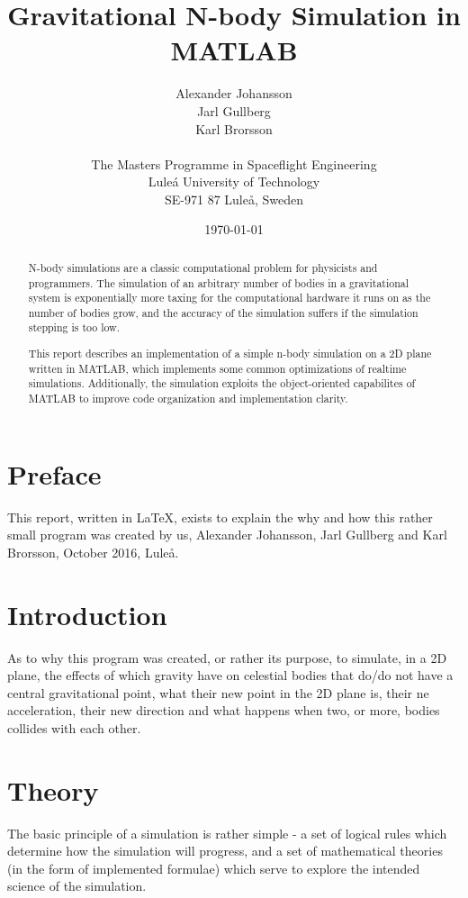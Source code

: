 \documentclass[11pt]{article}
\title{\textbf{Gravitational N-body Simulation in MATLAB}}
\author{Alexander Johansson\\
		Jarl Gullberg\\
		Karl Brorsson\\
		\\
		The Masters Programme in Spaceflight Engineering\\
		Lule\'a University of Technology\\SE-971 87 Luleå, Sweden}
\date{\today}
\begin{document}
\maketitle

\begin{abstract}
N-body simulations are a classic computational problem for physicists and programmers. The simulation of 
an arbitrary number of bodies in a gravitational system is exponentially more taxing for the computational 
hardware it runs on as the number of bodies grow, and the accuracy of the simulation suffers if the simulation
stepping is too low.

This report describes an implementation of a simple n-body simulation on a 2D plane written in MATLAB, which 
implements some common optimizations of realtime simulations. Additionally, the simulation exploits the 
object-oriented capabilites of MATLAB to improve code organization and implementation clarity.
\end{abstract}

\pagebreak
\listoftodos
\tableofcontents

\pagebreak
\section{Preface}
This report, written in LaTeX, exists to explain the why and how this rather small program was created by us, Alexander Johansson, Jarl Gullberg and Karl Brorsson, October 2016, Luleå.

\section{Introduction}
As to why this program was created, or rather its purpose, to simulate, in a 2D plane, the effects of which gravity have on celestial bodies that do/do not have a central gravitational point, what their new point in the 2D plane is, their ne acceleration, their new direction and what happens when two, or more, bodies collides with each other.

\section{Theory}
The basic principle of a simulation is rather simple - a set of logical rules which determine how the 
simulation will progress, and a set of mathematical theories (in the form of implemented formulae) which
serve to explore the intended science of the simulation.
\end{document}
